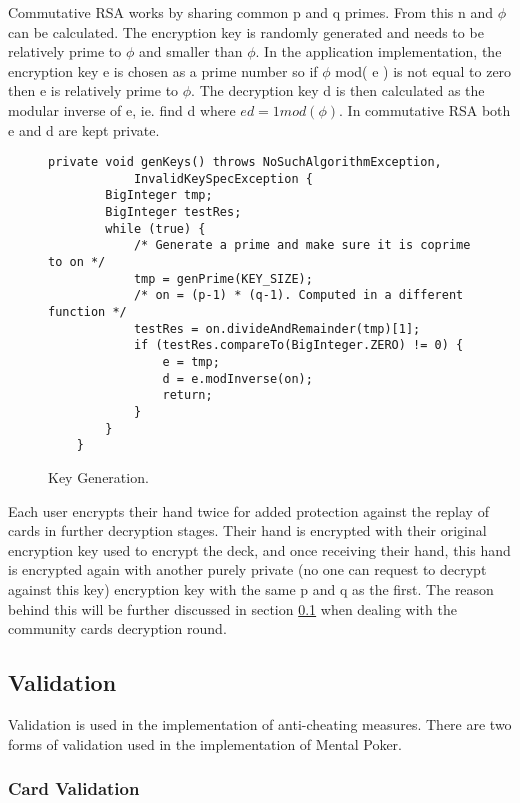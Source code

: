 \documentclass[11pt, oneside]{article}   	%
\begin{document}
Commutative RSA works by sharing common p and q primes. From this n and $\phi$ can be calculated. The encryption key is randomly generated and needs to be relatively prime to $\phi$ and smaller than $\phi$. In the application implementation, the encryption key e is chosen as a prime number so if $\phi$ mod( e ) is not equal to zero then e is relatively prime to $\phi$.  The decryption key d is then calculated as the modular inverse of e, ie. find d where $ed = 1 mod ( \phi)$. In commutative RSA both e and d are kept private.\\

\begin{figure}[H]
\caption{Key Generation.}
\begin{lstlisting}
private void genKeys() throws NoSuchAlgorithmException,
			InvalidKeySpecException {
		BigInteger tmp;
		BigInteger testRes;
		while (true) {
 			/* Generate a prime and make sure it is coprime to on */
			tmp = genPrime(KEY_SIZE);
			/* on = (p-1) * (q-1). Computed in a different function */
			testRes = on.divideAndRemainder(tmp)[1];
			if (testRes.compareTo(BigInteger.ZERO) != 0) {
				e = tmp;
				d = e.modInverse(on);
				return;
			}
		}
	}
\end{lstlisting}
\label{fig:code}
\end{figure}

Each user encrypts their hand twice for added protection against the replay of cards in further decryption stages. Their hand is encrypted with their original encryption key used to encrypt the deck, and once receiving their hand, this hand is encrypted again with another purely private (no one can request to decrypt against this key) encryption key with the same p and q as the first. The reason behind this will be further discussed in section \ref{sec:validation} when dealing with the community cards decryption round.

\subsection{Validation}
\label{sec:validation}

Validation is used in the implementation of anti-cheating measures. There are two forms of validation used in the implementation of Mental Poker.

\subsubsection{Card Validation}
\end{document}
